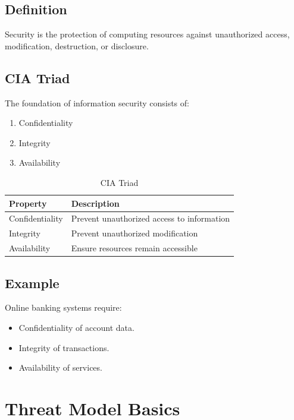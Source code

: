 \subsection{Definition}

Security is the protection of computing resources against unauthorized access, modification, destruction, or disclosure.

\subsection{CIA Triad}

The foundation of information security consists of:

\begin{enumerate}
\item Confidentiality
\item Integrity
\item Availability
\end{enumerate}

\begin{table}[h]
\centering
\begin{tabular}{|p{3cm}|p{9cm}|}
\hline
Property & Description \\
\hline
Confidentiality & Prevent unauthorized access to information \\
\hline
Integrity & Prevent unauthorized modification \\
\hline
Availability & Ensure resources remain accessible \\
\hline
\end{tabular}
\caption{CIA Triad}
\end{table}

\subsection{Example}

Online banking systems require:

\begin{itemize}
\item Confidentiality of account data.
\item Integrity of transactions.
\item Availability of services.
\end{itemize}

\section{Threat Model Basics}

